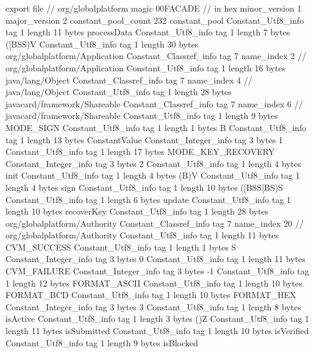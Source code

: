 export file {		// org/globalplatform
	magic	00FACADE		 // in hex
	minor_version	1
	major_version	2
	constant_pool_count	232
	constant_pool {
		Constant_Utf8_info {
			tag	1
			length	11
			bytes	processData
		}
		Constant_Utf8_info {
			tag	1
			length	7
			bytes	([BSS)V
		}
		Constant_Utf8_info {
			tag	1
			length	30
			bytes	org/globalplatform/Application
		}
		Constant_Classref_info {
			tag	7
			name_index	2		// org/globalplatform/Application
		}
		Constant_Utf8_info {
			tag	1
			length	16
			bytes	java/lang/Object
		}
		Constant_Classref_info {
			tag	7
			name_index	4		// java/lang/Object
		}
		Constant_Utf8_info {
			tag	1
			length	28
			bytes	javacard/framework/Shareable
		}
		Constant_Classref_info {
			tag	7
			name_index	6		// javacard/framework/Shareable
		}
		Constant_Utf8_info {
			tag	1
			length	9
			bytes	MODE_SIGN
		}
		Constant_Utf8_info {
			tag	1
			length	1
			bytes	B
		}
		Constant_Utf8_info {
			tag	1
			length	13
			bytes	ConstantValue
		}
		Constant_Integer_info {
			tag	3
			bytes	1
		}
		Constant_Utf8_info {
			tag	1
			length	17
			bytes	MODE_KEY_RECOVERY
		}
		Constant_Integer_info {
			tag	3
			bytes	2
		}
		Constant_Utf8_info {
			tag	1
			length	4
			bytes	init
		}
		Constant_Utf8_info {
			tag	1
			length	4
			bytes	(B)V
		}
		Constant_Utf8_info {
			tag	1
			length	4
			bytes	sign
		}
		Constant_Utf8_info {
			tag	1
			length	10
			bytes	([BSS[BS)S
		}
		Constant_Utf8_info {
			tag	1
			length	6
			bytes	update
		}
		Constant_Utf8_info {
			tag	1
			length	10
			bytes	recoverKey
		}
		Constant_Utf8_info {
			tag	1
			length	28
			bytes	org/globalplatform/Authority
		}
		Constant_Classref_info {
			tag	7
			name_index	20		// org/globalplatform/Authority
		}
		Constant_Utf8_info {
			tag	1
			length	11
			bytes	CVM_SUCCESS
		}
		Constant_Utf8_info {
			tag	1
			length	1
			bytes	S
		}
		Constant_Integer_info {
			tag	3
			bytes	0
		}
		Constant_Utf8_info {
			tag	1
			length	11
			bytes	CVM_FAILURE
		}
		Constant_Integer_info {
			tag	3
			bytes	-1
		}
		Constant_Utf8_info {
			tag	1
			length	12
			bytes	FORMAT_ASCII
		}
		Constant_Utf8_info {
			tag	1
			length	10
			bytes	FORMAT_BCD
		}
		Constant_Utf8_info {
			tag	1
			length	10
			bytes	FORMAT_HEX
		}
		Constant_Integer_info {
			tag	3
			bytes	3
		}
		Constant_Utf8_info {
			tag	1
			length	8
			bytes	isActive
		}
		Constant_Utf8_info {
			tag	1
			length	3
			bytes	()Z
		}
		Constant_Utf8_info {
			tag	1
			length	11
			bytes	isSubmitted
		}
		Constant_Utf8_info {
			tag	1
			length	10
			bytes	isVerified
		}
		Constant_Utf8_info {
			tag	1
			length	9
			bytes	isBlocked
}}}
